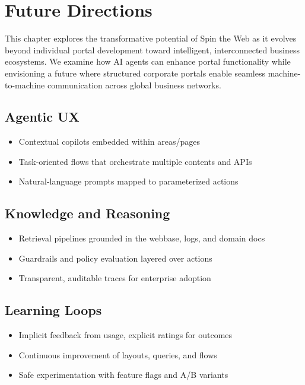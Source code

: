 
\chapter{Future Directions}
\label{chap:future-directions}

This chapter explores the transformative potential of Spin the Web as it evolves beyond individual portal development toward intelligent, interconnected business ecosystems. We examine how AI agents can enhance portal functionality while envisioning a future where structured corporate portals enable seamless machine-to-machine communication across global business networks.

\section{Agentic UX}
\begin{itemize}
	\item Contextual copilots embedded within areas/pages
	\item Task-oriented flows that orchestrate multiple contents and APIs
	\item Natural-language prompts mapped to parameterized actions
\end{itemize}

\section{Knowledge and Reasoning}
\begin{itemize}
	\item Retrieval pipelines grounded in the webbase, logs, and domain docs
	\item Guardrails and policy evaluation layered over actions
	\item Transparent, auditable traces for enterprise adoption
\end{itemize}

\section{Learning Loops}
\begin{itemize}
	\item Implicit feedback from usage, explicit ratings for outcomes
	\item Continuous improvement of layouts, queries, and flows
	\item Safe experimentation with feature flags and A/B variants
\end{itemize}

